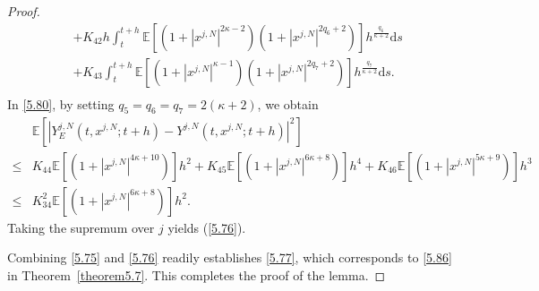 \documentclass[12pt]{article}
\numberwithin{equation}{section}
\begin{document}
\begin{proof}
\begin{equation}
\begin{aligned}
&+K_{42}h\int_t^{t+h}\mathbb{E}\left[\left(1+\left|x^{j,N}\right|^{2 \kappa-2}\right)\left(1+\left|x^{j,N}\right|^{2q_{6}+2}\right)\right]h^{\frac{q_6}{\kappa+2}}\mathrm{d} s\\
&+K_{43}\int_t^{t+h}\mathbb{E}\left[\left(1+\left|x^{j,N}\right|^{\kappa-1}\right)\left(1+\left|x^{j,N}\right|^{2q_{7}+2}\right)\right]h^{\frac{q_7}{\kappa+2}} \mathrm{d} s.\\
\end{aligned}
\end{equation}
In \eqref{5.80}, by setting $ q_5 = q_6 = q_7 = 2\left(\kappa + 2\right) $, we obtain
\begin{equation}\tag{5.107}\label{5.81}
\begin{aligned}
&\mathbb{E}\left[\left|Y^{j,N}_E\left(t, x^{j,N} ; t+h\right)-Y^{j,N}\left(t, x^{j,N} ; t+h\right)\right|^{2}\right] \\
\leq & K_{44}\mathbb{E}\left[\left(1+\left|x^{j,N}\right|^{4\kappa+10}\right)\right]h^2+K_{45} \mathbb{E}\left[\left(1+\left|x^{j,N}\right|^{6\kappa+8}\right)\right]h^4+K_{46}\mathbb{E}\left[ \left(1+\left|x^{j,N}\right|^{5\kappa+9}\right)\right]h^3\\
\leq & K^{2}_{34}\mathbb{E}\left[\left(1+\left|x^{j,N}\right|^{6\kappa+8}\right)\right] h^2.
\end{aligned}
\end{equation}
Taking the supremum over $j$ yields (\ref{5.76}).

Combining \eqref{5.75} and \eqref{5.76} readily establishes \eqref{5.77}, which corresponds to \eqref{5.86} in Theorem~\ref{theorem5.7}. 
This completes the proof of the lemma. 
\end{proof}
\end{document}
